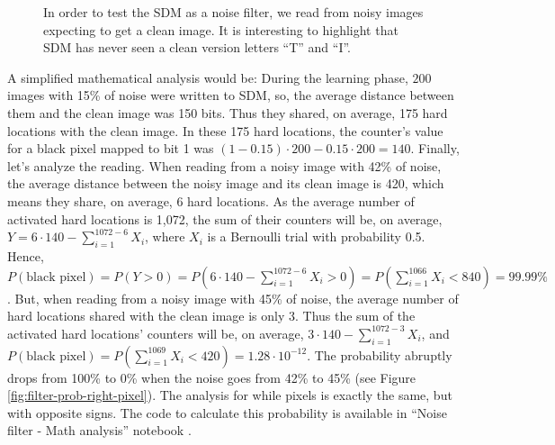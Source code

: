 \begin{figure}[!htb]


  \caption{In order to test the SDM as a noise filter, we read from noisy images expecting to get a clean image. It is interesting to highlight that SDM has never seen a clean version letters ``T'' and ``I''.
  \label{fig:filter-testing}
  }
\end{figure}

A simplified mathematical analysis would be: During the learning phase, $200$ images with 15\% of noise were written to SDM, so, the average distance between them and the clean image was 150 bits. Thus they shared, on average, 175 hard locations with the clean image. In these 175 hard locations, the counter's value for a black pixel mapped to bit 1 was $(1-0.15) \cdot 200 - 0.15 \cdot 200 = 140$. Finally, let's analyze the reading. When reading from a noisy image with 42\% of noise, the average distance between the noisy image and its clean image is 420, which means they share, on average, 6 hard locations. As the average number of activated hard locations is 1,072, the sum of their counters will be, on average, $Y = 6 \cdot 140 - \sum_{i=1}^{1072-6} X_i$, where $X_i$ is a Bernoulli trial with probability 0.5. Hence, $P(\text{black pixel}) = P(Y > 0) = P(6 \cdot 140 - \sum_{i=1}^{1072-6} X_i > 0) = P(\sum_{i=1}^{1066} X_i < 840) = 99.99\%$. But, when reading from a noisy image with 45\% of noise, the average number of hard locations shared with the clean image is only 3. Thus the sum of the activated hard locations' counters will be, on average, $3 \cdot 140 - \sum_{i=1}^{1072-3} X_i$, and $P(\text{black pixel}) = P(\sum_{i=1}^{1069} X_i < 420) = 1.28 \cdot 10^{-12}$. The probability abruptly drops from 100\% to 0\% when the noise goes from 42\% to 45\% (see Figure \ref{fig:filter-prob-right-pixel}). The analysis for while pixels is exactly the same, but with opposite signs. The code to calculate this probability is available in ``Noise filter - Math analysis'' notebook \citep{sdmframework}.

